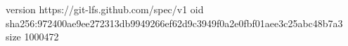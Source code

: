 version https://git-lfs.github.com/spec/v1
oid sha256:972400ae9ee272313db9949266ef62d9c3949f0a2e0fbf01aee3c25abc48b7a3
size 1000472
